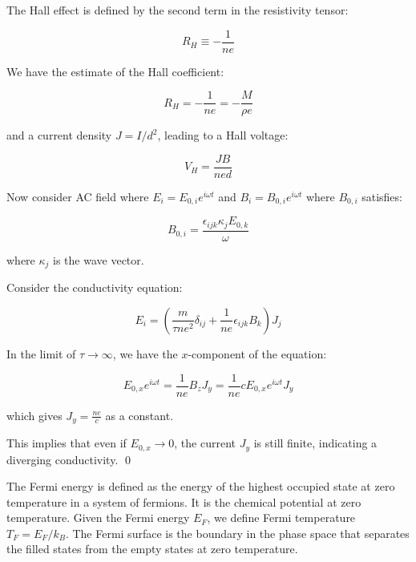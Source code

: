 \documentclass[12pt]{article}
\begin{document}
The Hall effect is defined by the second term in the resistivity tensor:

\begin{equation}
    R_{H} \equiv -\frac{1}{ne}
\end{equation}

We have the estimate of the Hall coefficient:

\begin{equation}
    R_{H} = -\frac{1}{ne} = -\frac{M}{\rho e}
\end{equation}

and a current density $J = I/d^{2}$, leading to a Hall voltage:

\begin{equation}
    V_{H} = \frac{JB}{ned}
\end{equation}


Now consider AC field where $E_{i} = E_{0, i} e^{i\omega t}$ and $B_{i} = B_{0, i} e^{i\omega t}$ where $B_{0, i}$ satisfies:

\begin{equation}
    B_{0, i} = \frac{\epsilon_{ijk} \kappa_{j} E_{0, k}}{\omega}
\end{equation}

where $\kappa_{j}$ is the wave vector.

Consider the conductivity equation:

\begin{equation}
    E_{i} = \left( \frac{m}{\tau n e^{2}} \delta_{ij} + \frac{1}{ne} \epsilon_{ijk} B_{k} \right) J_{j}
\end{equation}

In the limit of $\tau \to \infty$, we have the $x$-component of the equation:

\begin{equation}
    E_{0, x} e^{i\omega t} = \frac{1}{ne} B_{z} J_{y} = \frac{1}{ne} c E_{0, x} e^{i\omega t} J_{y}
\end{equation}

which gives $J_{y} = \frac{ne}{c}$ as a constant.

This implies that even if $E_{0, x} \to 0$, the current $J_{y}$ is still finite, indicating a diverging conductivity.
\qed




The Fermi energy is defined as the energy of the highest occupied state at zero temperature in a system of fermions. It is the chemical potential at zero temperature. Given the Fermi energy $E_{F}$, we define Fermi temperature $T_{F} = E_{F}/k_{B}$. The Fermi surface is the boundary in the phase space that separates the filled states from the empty states at zero temperature.
\end{document}
